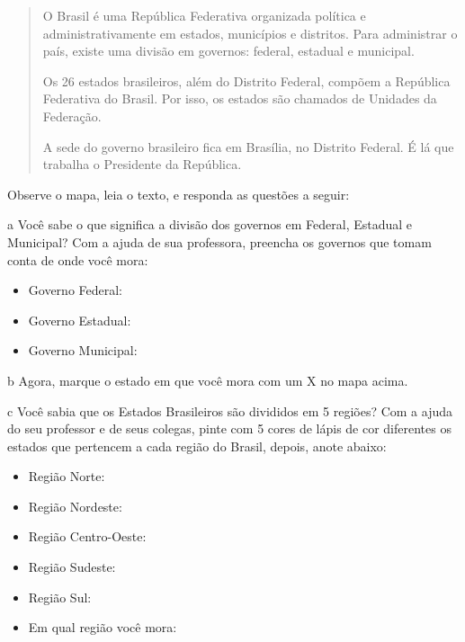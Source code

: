 \begin{quote}
O Brasil é uma República Federativa organizada política e
administrativamente em estados, municípios e distritos. Para administrar
o país, existe uma divisão em governos: federal, estadual e municipal.

Os 26 estados brasileiros, além do Distrito Federal, compõem a República
Federativa do Brasil. Por isso, os estados são chamados de Unidades da
Federação.

A sede do governo brasileiro fica em Brasília, no Distrito Federal. É lá
que trabalha o Presidente da República.

\end{quote}

Observe o mapa, leia o texto, e responda as questões a seguir:

\num{a} Você sabe o que significa a divisão dos governos em Federal, Estadual e
Municipal? Com a ajuda de sua professora, preencha os governos que tomam
conta de onde você mora:

\begin{itemize}
\item Governo Federal: \preencher {}

\item Governo Estadual: \preencher {}

\item Governo Municipal: \preencher {}
\end{itemize}

\num{b} Agora, marque o estado em que você mora com um X no mapa acima.

\num{c} Você sabia que os Estados Brasileiros são divididos em 5 regiões? Com a
ajuda do seu professor e de seus colegas, pinte com 5 cores de lápis de
cor diferentes os estados que pertencem a cada região do Brasil, depois,
anote abaixo:

\begin{itemize}
\item Região Norte: 

\item Região Nordeste: 

\item Região Centro-Oeste: 

\item Região Sudeste: 

\item Região Sul: 

\item Em qual região você mora: 
\end{itemize}

